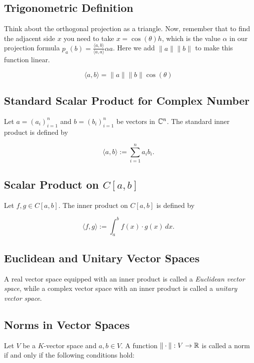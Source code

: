 \subsection{Trigonometric Definition}

Think about the orthogonal projection as a triangle. Now, remember that to find the adjacent side \(x\) 
you need to take \(x = \cos(\theta)h\), which is the value \(\alpha\) in our projection formula 
\(p_a (b) = \frac{\langle a, b\rangle}{\langle a, a\rangle} \alpha a\). 
Here we add \(\|a\|\|b\|\) to make this function linear.

\[
    \langle a, b \rangle = \|a\| \|b\| \cos (\theta)
\]

\subsection{Standard Scalar Product for Complex Number}

Let \( a = {(a_i)}_{i=1}^n \) and \( b = {(b_i)}_{i=1}^n \) be vectors in \( \mathbb{C}^n \). The standard 
inner product is defined by

\[
    \langle a, b \rangle := \sum_{i=1}^n a_i b_i.
\]

\subsection{Scalar Product on \texorpdfstring{\( C[a, b] \)}{}}

Let \( f, g \in C[a, b] \). The inner product on \( C[a, b] \) is defined by

\[
    \langle f, g \rangle := \int_a^b f(x) \cdot g(x) \, dx.
\]

\subsection{Euclidean and Unitary Vector Spaces}

A real vector space equipped with an inner product is called a \emph{Euclidean vector space}, while a 
complex vector space with an inner product is called a \emph{unitary vector space}.

\subsection{Norms in Vector Spaces}

Let \( V \) be a \( K \)-vector space and \( a, b \in V \). A function \( \| \cdot \| : V \to \mathbb{R} \) 
is called a norm if and only if the following conditions hold:

